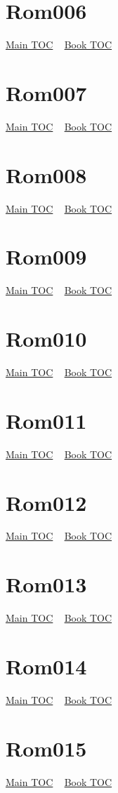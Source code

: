 \documentclass{book}
\begin{document}
  \section{Rom006}\hyperlink{toc}{Main TOC} ~ \hyperref[subsec:Rom]{Book TOC} 
  \section{Rom007}\hyperlink{toc}{Main TOC} ~ \hyperref[subsec:Rom]{Book TOC} 
  \section{Rom008}\hyperlink{toc}{Main TOC} ~ \hyperref[subsec:Rom]{Book TOC} 
  \section{Rom009}\hyperlink{toc}{Main TOC} ~ \hyperref[subsec:Rom]{Book TOC} 
  \section{Rom010}\hyperlink{toc}{Main TOC} ~ \hyperref[subsec:Rom]{Book TOC} 
  \section{Rom011}\hyperlink{toc}{Main TOC} ~ \hyperref[subsec:Rom]{Book TOC} 
  \section{Rom012}\hyperlink{toc}{Main TOC} ~ \hyperref[subsec:Rom]{Book TOC} 
  \section{Rom013}\hyperlink{toc}{Main TOC} ~ \hyperref[subsec:Rom]{Book TOC} 
  \section{Rom014}\hyperlink{toc}{Main TOC} ~ \hyperref[subsec:Rom]{Book TOC} 
  \section{Rom015}\hyperlink{toc}{Main TOC} ~ \hyperref[subsec:Rom]{Book TOC} 
\end{document}
